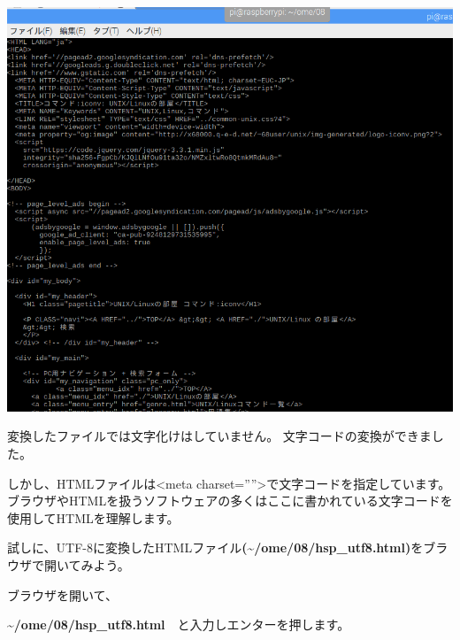 \documentclass[a4paper,12pt,dvipdfmx]{jarticle}
\begin{document}
\begin{center}
\includegraphics[width=17.006cm,height=12.086cm]{textbook-img023.png}

\end{center}
変換したファイルでは文字化けはしていません。
文字コードの変換ができました。

\clearpage
しかし、HTMLファイルは{\textless}meta
charset=””{\textgreater}で文字コードを指定しています。
ブラウザやHTMLを扱うソフトウェアの多くはここに書かれている文字コードを使用してHTMLを理解します。

試しに、UTF-8に変換したHTMLファイル\textbf{(\~{}/ome/08/hsp\_utf8.html)}をブラウザで開いてみよう。

ブラウザを開いて、

\textbf{\~{}/ome/08/hsp\_utf8.html}　と入力しエンターを押します。
\end{document}
